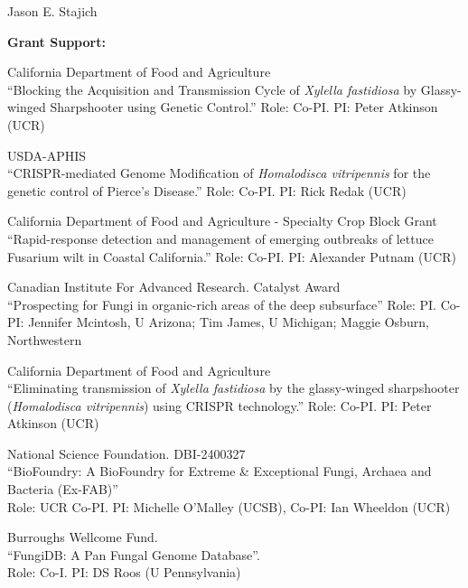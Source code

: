 \documentclass[10pt]{article}
\begin{document}
\begin{cv}{\centerline{Jason E. Stajich}}
\begin{cvlistcompact}{\bf Grant Support:}
\item [2024-2025] California Department of Food and Agriculture \\
``Blocking the Acquisition and Transmission Cycle of \textit{Xylella fastidiosa} by Glassy-winged Sharpshooter using Genetic Control.''
Role: Co-PI. PI: Peter Atkinson (UCR)

\item [2024-2025] USDA-APHIS \\
``CRISPR-mediated Genome Modification of \textit{Homalodisca vitripennis} for the genetic control of Pierce’s Disease.''
Role: Co-PI. PI: Rick Redak (UCR)

\item [2023-2026] California Department of Food and Agriculture - Specialty Crop Block Grant \\
``Rapid-response detection and management of emerging outbreaks of lettuce Fusarium wilt in Coastal California.''
Role: Co-PI. PI: Alexander Putnam (UCR)

\item [2024-2026] Canadian Institute For Advanced Research. Catalyst Award \\
  ``Prospecting for Fungi in organic-rich areas of the deep subsurface''
Role: PI. Co-PI: Jennifer Mcintosh, U Arizona; Tim James, U Michigan; Maggie Osburn, Northwestern

\item [2023-2024] California Department of Food and Agriculture \\
``Eliminating transmission of \textit{Xylella fastidiosa} by the glassy-winged sharpshooter (\textit{Homalodisca vitripennis}) using CRISPR technology.''
Role: Co-PI. PI: Peter Atkinson (UCR)

\item [2024-2030] National Science Foundation. DBI-2400327 \\
``BioFoundry: A BioFoundry for Extreme \& Exceptional Fungi, Archaea and Bacteria (Ex-FAB)'' \\
Role: UCR Co-PI. PI: Michelle O'Malley (UCSB), Co-PI: Ian Wheeldon (UCR)

\item [{\bf Completed support}]

\item [2010-2013] Burroughs Wellcome Fund. \\
 ``FungiDB: A Pan Fungal Genome Database''. \\
Role: Co-I. PI: DS Roos (U Pennsylvania)


\end{cvlistcompact}
\end{cv}
\end{document}
